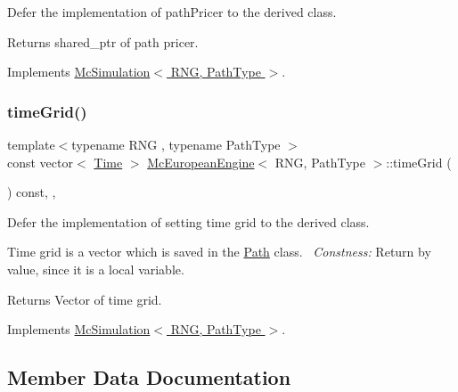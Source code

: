 Defer the implementation of path\+Pricer to the derived class. 

\begin{DoxyReturn}{Returns}
shared\+\_\+ptr of path pricer. 
\end{DoxyReturn}


Implements \hyperlink{class_mc_simulation_a64a3e635c1fa9d25797dc0cbad767238}{Mc\+Simulation$<$ R\+N\+G, Path\+Type $>$}.

\hypertarget{class_mc_european_engine_ae4e0ab6834416144221f1a91dd154587}{}\label{class_mc_european_engine_ae4e0ab6834416144221f1a91dd154587} 
\subsubsection{\texorpdfstring{time\+Grid()}{timeGrid()}}
{\footnotesize\ttfamily template$<$typename R\+NG , typename Path\+Type $>$ \\
const vector$<$ \hyperlink{_name_def_8h_ac2d3e0ba793497bcca555c7c2cf64ff3}{Time} $>$ \hyperlink{class_mc_european_engine}{Mc\+European\+Engine}$<$ R\+NG, Path\+Type $>$\+::time\+Grid (\begin{DoxyParamCaption}{ }\end{DoxyParamCaption}) const\hspace{0.3cm}{\ttfamily [override]}, {\ttfamily [private]}, {\ttfamily [virtual]}}



Defer the implementation of setting time grid to the derived class. 

Time grid is a vector which is saved in the \hyperlink{class_path}{Path} class.~\newline
{\itshape Constness\+:} Return by value, since it is a local variable. \begin{DoxyReturn}{Returns}
Vector of time grid. 
\end{DoxyReturn}


Implements \hyperlink{class_mc_simulation_acf7d24981be3025a2cf07f8623dbe8ce}{Mc\+Simulation$<$ R\+N\+G, Path\+Type $>$}.



\subsection{Member Data Documentation}
\hypertarget{class_mc_european_engine_a25c0f328428ef5d24fef469e8861cca7}{}\label{class_mc_european_engine_a25c0f328428ef5d24fef469e8861cca7} 
